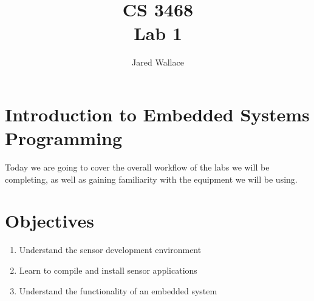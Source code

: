 \documentclass[letterpaper,12pt]{article}
\title{\Large CS 3468\\Lab 1}
\author{Jared Wallace}
\date{}
\begin{document}
\maketitle

\vspace{30mm}

\section*{Introduction to Embedded Systems Programming}
Today we are going to cover the overall workflow of the labs
we will be completing, as well as gaining familiarity with the
equipment we will be using.

\section*{Objectives}
\begin{enumerate}
	\item Understand the sensor development environment
	\item Learn to compile and install sensor applications
	\item Understand the functionality of an embedded system
\end{enumerate}
\end{document}
